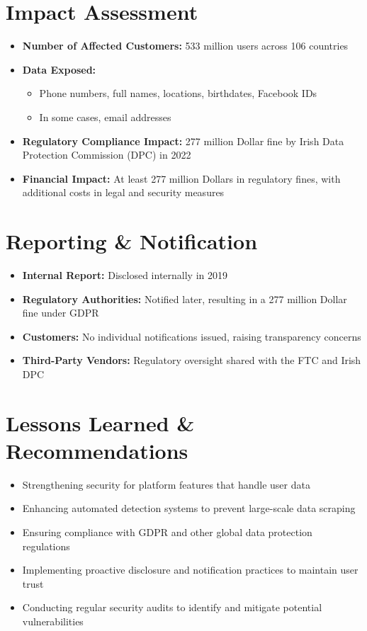 \documentclass[11pt]{book}
\begin{document}
\section{Impact Assessment}
\begin{itemize}
    \item \textbf{Number of Affected Customers:} 533 million users across 106 countries
    \item \textbf{Data Exposed:} 
    \begin{itemize}
        \item Phone numbers, full names, locations, birthdates, Facebook IDs
        \item In some cases, email addresses
    \end{itemize}
    \item \textbf{Regulatory Compliance Impact:} 277 million Dollar fine by Irish Data Protection Commission (DPC) in 2022
    \item \textbf{Financial Impact:} At least 277 million Dollars in regulatory fines, with additional costs in legal and security measures
\end{itemize}

\section{Reporting \& Notification}
\begin{itemize}
    \item \textbf{Internal Report:} Disclosed internally in 2019
    \item \textbf{Regulatory Authorities:} Notified later, resulting in a 277 million Dollar fine under GDPR
    \item \textbf{Customers:} No individual notifications issued, raising transparency concerns
    \item \textbf{Third-Party Vendors:} Regulatory oversight shared with the FTC and Irish DPC
\end{itemize}

\section{Lessons Learned \& Recommendations}
\begin{itemize}
    \item Strengthening security for platform features that handle user data
    \item Enhancing automated detection systems to prevent large-scale data scraping
    \item Ensuring compliance with GDPR and other global data protection regulations
    \item Implementing proactive disclosure and notification practices to maintain user trust
    \item Conducting regular security audits to identify and mitigate potential vulnerabilities
\end{itemize}
\end{document}

